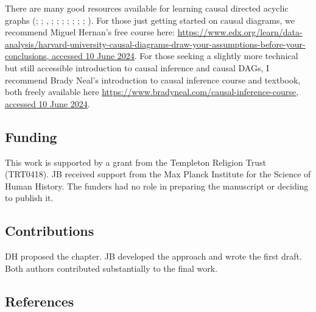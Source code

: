 \documentclass[
  singlecolumn]{article}
\begin{document}
There are many good resources available for learning causal directed
acyclic graphs (;
;
,
;
;
;
;
;
; ; ). For those
just getting started on causal diagrams, we recommend Miguel Hernan's
free course here:
\href{https://www.edx.org/learn/data-analysis/harvard-university-causal-diagrams-draw-your-assumptions-before-your-conclusions}{https://www.edx.org/learn/data-analysis/harvard-university-causal-diagrams-draw-your-assumptions-before-your-conclusions,
accessed 10 June 2024}. For those seeking a slightly more technical but
still accessible introduction to causal inference and causal DAGs, I
recommend Brady Neal's introduction to causal inference course and
textbook, both freely available here
\href{https://www.bradyneal.com/causal-inference-course}{https://www.bradyneal.com/causal-inference-course,
accessed 10 June 2024}.

\newpage{}

\subsection{Funding}\label{funding}

This work is supported by a grant from the Templeton Religion Trust
(TRT0418). JB received support from the Max Planck Institute for the
Science of Human History. The funders had no role in preparing the
manuscript or deciding to publish it.

\subsection{Contributions}\label{contributions}

DH proposed the chapter. JB developed the approach and wrote the first
draft. Both authors contributed substantially to the final work.

\newpage{}

\subsection{References}\label{references}
\end{document}
